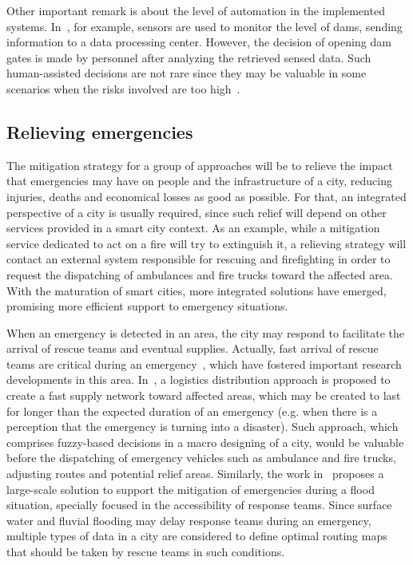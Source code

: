 \begin{refsection}
Other important remark is about the level of automation in the implemented systems. In~\cite{iotFlood2}, for example, sensors are used to monitor the level of dams, sending information to a data processing center. However, the decision of opening dam gates is made by personnel after analyzing the retrieved sensed data. Such human-assisted decisions are not rare since they may be valuable in some scenarios when the risks involved are too high~\cite{humanAssisted1}.

\subsection{Relieving emergencies}

The mitigation strategy for a group of approaches will be to relieve the impact that emergencies may have on people and the infrastructure of a city, reducing injuries, deaths and economical losses as good as possible. For that, an integrated perspective of a city is usually required, since such relief will depend on other services provided in a smart city context. As an example, while a mitigation service dedicated to act on a fire will try to extinguish it, a relieving strategy will contact an external system responsible for rescuing and firefighting in order to request the dispatching of ambulances and fire trucks toward the affected area. With the maturation of smart cities, more integrated solutions have emerged, promising more efficient support to emergency situations. 

When an emergency is detected in an area, the city may respond to facilitate the arrival of rescue teams and eventual supplies. Actually, fast arrival of rescue teams are critical during an emergency~\cite{mitigationurban3}, which have fostered important research developments in this area. In~\cite{mitigationurban1}, a logistics distribution approach is proposed to create a fast supply network toward affected areas, which may be created to last for longer than the expected duration of an emergency (e.g. when there is a perception that the emergency is turning into a disaster). Such approach, which comprises fuzzy-based decisions in a macro designing of a city, would be valuable before the dispatching of emergency vehicles such as ambulance and fire trucks, adjusting routes and potential relief areas. Similarly, the work in~\cite{mitigationurban3} proposes a large-scale solution to support the mitigation of emergencies during a flood situation, specially focused in the accessibility of response teams. Since surface water and fluvial flooding may delay response teams during an emergency, multiple types of data in a city are considered to define optimal routing maps that should be taken by rescue teams in such conditions.


\end{refsection}
